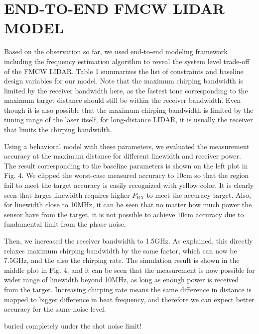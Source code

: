 \documentclass{article}
\begin{document}


\section{END-TO-END FMCW LIDAR MODEL}
\label{sec:experiment}



Based on the observation so far, we used end-to-end modeling framework including the frequency estimation algorithm to reveal the system level trade-off of the FMCW LIDAR. Table 1 summarizes the list of constraints and baseline design variables for our model. Note that the maximum chirping bandwidth is limited by the receiver bandwidth here, as the fastest tone corresponding to the maximum target distance should still be within the receiver bandwidth. Even though it is also possible that the maximum chirping bandwidth is limited by the tuning range of the laser itself, for long-distance LIDAR, it is usually the receiver that limits the chirping bandwidth.

Using a behavioral model with these parameters, we evaluated the measurement accuracy at the maximum distance for different linewidth and receiver power. The result corresponding to the baseline parameters is shown on the left plot in Fig. 4. We clipped the worst-case measured accuracy to 10cm so that the region fail to meet the target accuracy is easily recognized with yellow color. It is clearly seen that larger linewidth requires higher $P_\text{RX}$ to meet the accuracy target. Also, for linewidth close to 10MHz, it can be seen that no matter how much power the sensor have from the target, it is not possible to achieve 10cm accuracy due to fundamental limit from the phase noise.

Then, we increased the receiver bandwidth to 1.5GHz. As explained, this directly relaxes maximum chirping bandwidth by the same factor, which can now be 7.5GHz, and the also the chirping rate. The simulation result is shown in the middle plot in Fig. 4, and it can be seen that the measurement is now possible for wider range of linewidth beyond 10MHz, as long as enough power is received from the target. Increasing chirping rate means the same difference in distance is mapped to bigger difference in beat frequency, and therefore we can expect better accuracy for the same noise level.

buried completely under the shot noise limit!
\end{document}
